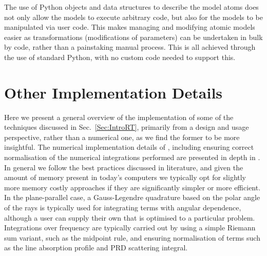 The use of Python objects and data structures to describe the model atoms does not only allow the models to execute arbitrary code, but also for the models to be manipulated via user code.
This makes managing and modifying atomic models easier as transformations (modifications of parameters) can be undertaken in bulk by code, rather than a painstaking manual process.
This is all achieved through the use of standard Python, with no custom code needed to support this.

\section{Other Implementation Details}

Here we present a general overview of the implementation of some of the techniques discussed in Sec.~\ref{Sec:IntroRT}, primarily from a design and usage perspective, rather than a numerical one, as we find the former to be more insightful.
The numerical implementation details of \Lw{}, including ensuring correct normalisation of the numerical integrations performed are presented in depth in \citet{Osborne2021}.
In general we follow the best practices discussed in literature, and given the amount of memory present in today's computers we typically opt for slightly more memory costly approaches if they are significantly simpler or more efficient.
In the plane-parallel case, a Gauss-Legendre quadrature based on the polar angle of the rays is typically used for integrating terms with angular dependence, although a user can supply their own that is optimised to a particular problem.
Integrations over frequency are typically carried out by using a simple Riemann sum variant, such as the midpoint rule, and ensuring normalisation of terms such as the line absorption profile and PRD scattering integral.

